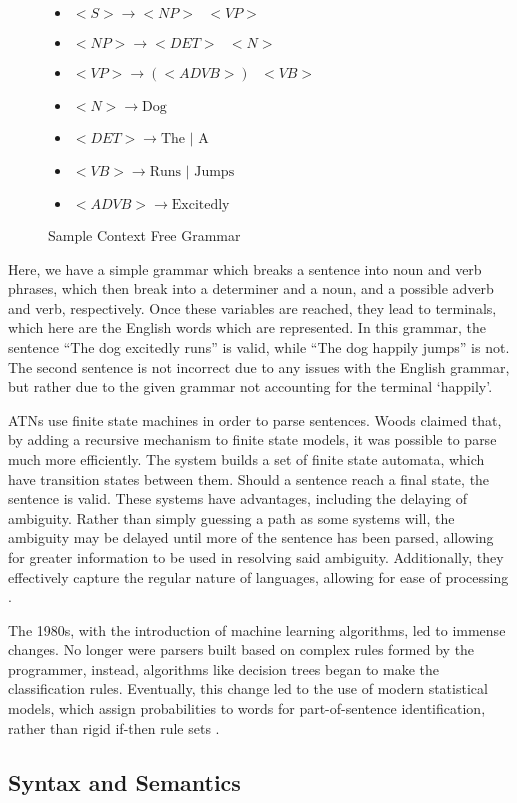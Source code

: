 \begin{figure}
\begin{center}

\begin{itemize}

\item $<S> \rightarrow <NP> \text{ } <VP>$
\item $<NP> \rightarrow <DET> \text{ } <N>$
\item $<VP> \rightarrow (<ADVB>) \text{ } <VB>$
\item $<N> \rightarrow \text{Dog}$
\item $<DET> \rightarrow \text{The | A}$
\item $<VB> \rightarrow \text{Runs | Jumps}$
\item $<ADVB> \rightarrow \text{Excitedly}$

\end{itemize}
\end{center}
\caption{Sample Context Free Grammar}
\end{figure}


Here, we have a simple grammar which breaks a sentence into noun and verb phrases, which then break into a determiner and a noun, and a possible adverb and verb, respectively. Once these variables are reached, they lead to terminals, which here are the English words which are represented. In this grammar, the sentence ``The dog excitedly runs'' is valid, while ``The dog happily jumps'' is not. The second sentence is not incorrect due to any issues with the English grammar, but rather due to the given grammar not accounting for the terminal `happily'.

ATNs use finite state machines in order to parse sentences. Woods claimed that, by adding a recursive mechanism to finite state models, it was possible to parse much more efficiently. The system builds a set of finite state automata, which have transition states between them. Should a sentence reach a final state, the sentence is valid. These systems have advantages, including the delaying of ambiguity. Rather than simply guessing a path as some systems will, the ambiguity may be delayed until more of the sentence has been parsed, allowing for greater information to be used in resolving said ambiguity. Additionally, they effectively capture the regular nature of languages, allowing for ease of processing \cite{ATN}.

The 1980s, with the introduction of machine learning algorithms, led to immense changes. No longer were parsers built based on complex rules formed by the programmer, instead, algorithms like decision trees began to make the classification rules. Eventually, this change led to the use of modern statistical models, which assign probabilities to words for part-of-sentence identification, rather than rigid if-then rule sets \cite{1980}.

\subsection{Syntax and Semantics}


